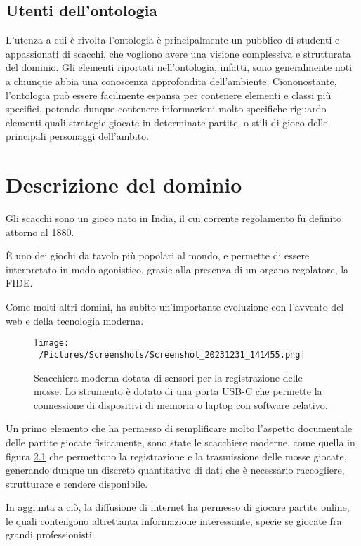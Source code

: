 \documentclass[12pt]{book}
\begin{document}
\section{Utenti dell'ontologia}

L'utenza a cui è rivolta l'ontologia è principalmente un pubblico di
studenti e appassionati di scacchi, che vogliono avere una visione
complessiva e strutturata del dominio. Gli elementi riportati nell'ontologia,
infatti, sono generalmente noti a chiunque abbia una conoscenza
approfondita dell'ambiente. Ciononostante, l'ontologia può essere
facilmente espansa per contenere elementi e classi più specifici,
potendo dunque contenere informazioni molto specifiche riguardo
elementi quali strategie giocate in determinate partite, o stili di
gioco delle principali personaggi dell'ambito.

\chapter{Descrizione del dominio}

Gli scacchi sono un gioco nato in India, il cui corrente regolamento 
fu definito attorno al 1880. 

È uno dei giochi da tavolo più popolari al mondo,
e permette di essere interpretato in modo agonistico,
grazie alla presenza di un organo regolatore, la FIDE.

Come molti altri domini, ha subito un'importante evoluzione con l'avvento del web e
della tecnologia moderna.

\begin{figure}[h]
  \caption{Scacchiera moderna dotata di sensori per la registrazione
  delle mosse. Lo strumento è dotato di una porta USB-C che permette
  la connessione di dispositivi di memoria o laptop con software
  relativo.}
  \centering
  \label{fig:scacchiera}
  \texttt{[image: ~/Pictures/Screenshots/Screenshot\_20231231\_141455.png]}
\end{figure} 
Un primo elemento che ha permesso di
semplificare molto l'aspetto documentale
delle partite giocate fisicamente, sono state le scacchiere moderne,
come quella in figura \ref{fig:scacchiera} che
permettono la registrazione e la trasmissione delle mosse giocate,
generando dunque un discreto quantitativo di dati che è necessario
raccogliere, strutturare e rendere disponibile.

In aggiunta a ciò, la diffusione di internet ha permesso di giocare
partite
online, le quali contengono altrettanta informazione interessante,
specie se giocate fra grandi professionisti. 
\end{document}
